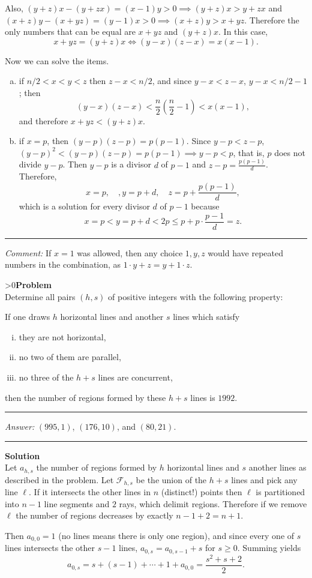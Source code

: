 \documentclass[12pt,oneside,a4paper]{book}
\newcounter{probnum}
\newcounter{solnum}
\newcommand{\prob}{\ifnum\value{probnum}>0\newpage\fi\setcounter{solnum}{0}\stepcounter{probnum}\textbf{Problem \theprobnum}\\}
\newcommand{\ans}{\medskip\hrule\medbreak\emph{Answer: }}
\newcommand{\comment}{\medskip\hrule\medbreak\emph{Comment: }}
\newcommand{\sol}{\medskip\hrule\medbreak\textbf{Solution}\\}
\begin{document}
Also, $(y+z)x - (y+zx) = (x-1)y > 0\implies (y+z)x > y+zx$ and $(x+z)y - (x+yz) = (y-1)x>0\implies (x+z)y > x+yz$. Therefore the only numbers that can be equal are $x+yz$ and $(y+z)x$. In this case,
\[x+yz = (y+z)x\iff (y-x)(z-x) = x(x-1).\]

Now we can solve the items.
\begin{enumerate}[(a)]
\item if $n/2 < x < y < z$ then $z-x < n/2$, and since $y-x < z-x$, $y-x < n/2-1$; then
\[(y-x)(z-x) < \frac n2\left(\frac n2 - 1\right) < x(x-1),\]
and therefore $x+yz < (y+z)x$.
\item if $x=p$, then $(y-p)(z-p) = p(p-1)$. Since $y-p < z-p$, $(y-p)^2 < (y-p)(z-p) = p(p-1)\implies y-p < p$, that is, $p$ does not divide $y-p$. Then $y-p$ is a divisor $d$ of $p-1$ and $z-p = \frac{p(p-1)}d$. Therefore,
\[x=p,\quad, y=p+d,\quad z=p+\frac{p(p-1)}d,\]
which is a solution for every divisor $d$ of $p-1$ because
\[x=p < y=p+d < 2p \le p + p\cdot\frac{p-1}d = z.\]
\end{enumerate}

\comment
If $x=1$ was allowed, then any choice $1,y,z$ would have repeated numbers in the combination, as $1\cdot y + z = y + 1\cdot z$.

\prob Determine all pairs $(h,s)$ of positive integers with the following property:

If one draws $h$ horizontal lines and another $s$ lines which satisfy
\begin{enumerate}[(i)]
\item they are not horizontal,
\item no two of them are parallel,
\item no three of the $h+s$ lines are concurrent,
\end{enumerate}
then the number of regions formed by these $h+s$ lines is $1992$.

\ans $(995,1)$, $(176,10)$, and $(80,21)$.

\sol
Let $a_{h,s}$ the number of regions formed by $h$ horizontal lines and $s$ another lines as described in the problem. Let $\mathcal{F}_{h,s}$ be the union of the $h+s$ lines and pick any line $\ell$. If it intersects the other lines in $n$ (distinct!) points then $\ell$ is partitioned into $n-1$ line segments and $2$ rays, which delimit regions. Therefore if we remove $\ell$ the number of regions decreases by exactly $n-1+2=n+1$.

Then $a_{0,0} = 1$ (no lines means there is only one region), and since every one of $s$ lines intersects the other $s-1$ lines, $a_{0,s} = a_{0,s-1} + s$ for $s\ge 0$. Summing yields
\[a_{0,s} = s + (s-1) + \cdots + 1 + a_{0,0} = \frac{s^2+s+2}2.\]
\end{document}
